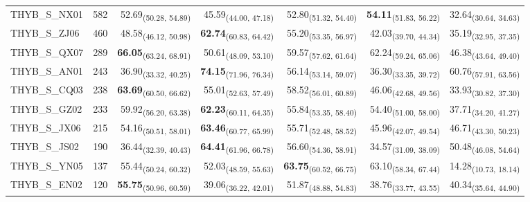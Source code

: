 \begin{table}[p]
\begin{tabular}{llrrrrr}
THYB\_S\_NX01 & 582 & 52.69\textsubscript{(50.28, 54.89)} & 45.59\textsubscript{(44.00, 47.18)} & 52.80\textsubscript{(51.32, 54.40)} & \textbf{54.11}\textsubscript{(51.83, 56.22)} & 32.64\textsubscript{(30.64, 34.63)} \\
THYB\_S\_ZJ06 & 460 & 48.58\textsubscript{(46.12, 50.98)} & \textbf{62.74}\textsubscript{(60.83, 64.42)} & 55.20\textsubscript{(53.35, 56.97)} & 42.03\textsubscript{(39.70, 44.34)} & 35.19\textsubscript{(32.95, 37.35)} \\
THYB\_S\_QX07 & 289 & \textbf{66.05}\textsubscript{(63.24, 68.91)} & 50.61\textsubscript{(48.09, 53.10)} & 59.57\textsubscript{(57.62, 61.64)} & 62.24\textsubscript{(59.24, 65.06)} & 46.38\textsubscript{(43.64, 49.40)} \\
THYB\_S\_AN01 & 243 & 36.90\textsubscript{(33.32, 40.25)} & \textbf{74.15}\textsubscript{(71.96, 76.34)} & 56.14\textsubscript{(53.14, 59.07)} & 36.30\textsubscript{(33.35, 39.72)} & 60.76\textsubscript{(57.91, 63.56)} \\
THYB\_S\_CQ03 & 238 & \textbf{63.69}\textsubscript{(60.50, 66.62)} & 55.01\textsubscript{(52.63, 57.49)} & 58.52\textsubscript{(56.01, 60.89)} & 46.06\textsubscript{(42.68, 49.56)} & 33.93\textsubscript{(30.82, 37.30)} \\
THYB\_S\_GZ02 & 233 & 59.92\textsubscript{(56.20, 63.38)} & \textbf{62.23}\textsubscript{(60.11, 64.35)} & 55.84\textsubscript{(53.35, 58.40)} & 54.40\textsubscript{(51.00, 58.00)} & 37.71\textsubscript{(34.20, 41.27)} \\
THYB\_S\_JX06 & 215 & 54.16\textsubscript{(50.51, 58.01)} & \textbf{63.46}\textsubscript{(60.77, 65.99)} & 55.71\textsubscript{(52.48, 58.52)} & 45.96\textsubscript{(42.07, 49.54)} & 46.71\textsubscript{(43.30, 50.23)} \\
THYB\_S\_JS02 & 190 & 36.44\textsubscript{(32.39, 40.43)} & \textbf{64.41}\textsubscript{(61.96, 66.78)} & 56.60\textsubscript{(54.36, 58.91)} & 34.57\textsubscript{(31.09, 38.09)} & 50.48\textsubscript{(46.08, 54.64)} \\
THYB\_S\_YN05 & 137 & 55.44\textsubscript{(50.24, 60.32)} & 52.03\textsubscript{(48.59, 55.63)} & \textbf{63.75}\textsubscript{(60.52, 66.75)} & 63.10\textsubscript{(58.34, 67.44)} & 14.28\textsubscript{(10.73, 18.14)} \\
THYB\_S\_EN02 & 120 & \textbf{55.75}\textsubscript{(50.96, 60.59)} & 39.06\textsubscript{(36.22, 42.01)} & 51.87\textsubscript{(48.88, 54.83)} & 38.76\textsubscript{(33.77, 43.55)} & 40.34\textsubscript{(35.64, 44.90)} \\

\end{tabular}
\end{table}
